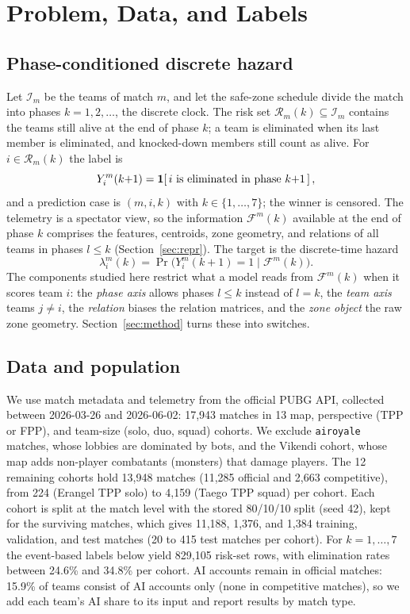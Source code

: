 \section{Problem, Data, and Labels}\label{sec:problem}

\subsection{Phase-conditioned discrete hazard}\label{sec:hazard}
Let $\mathcal{I}_m$ be the teams of match $m$, and let the safe-zone schedule divide the match into phases $k=1,2,\dots$, the discrete clock. The risk set $\mathcal{R}_m(k)\subseteq\mathcal{I}_m$ contains the teams still alive at the end of phase $k$; a team is eliminated when its last member is eliminated, and knocked-down members still count as alive. For $i\in\mathcal{R}_m(k)$ the label is
\begin{equation}
Y_i^m(k{+}1)=\mathbf{1}\!\left[\,i\text{ is eliminated in phase }k{+}1\,\right],
\label{eq:label}
\end{equation}
and a prediction case is $(m,i,k)$ with $k\in\{1,\dots,7\}$; the winner is censored. The telemetry is a spectator view, so the information $\mathcal{F}^m(k)$ available at the end of phase $k$ comprises the features, centroids, zone geometry, and relations of all teams in phases $l\le k$ (Section~\ref{sec:repr}). The target is the discrete-time hazard
\begin{equation}
\lambda_i^m(k)=\Pr\bigl(Y_i^m(k{+}1)=1\mid\mathcal{F}^m(k)\bigr).
\label{eq:hazard}
\end{equation}
The components studied here restrict what a model reads from $\mathcal{F}^m(k)$ when it scores team $i$: the \emph{phase axis} allows phases $l\le k$ instead of $l=k$, the \emph{team axis} teams $j\neq i$, the \emph{relation} biases the relation matrices, and the \emph{zone object} the raw zone geometry. Section~\ref{sec:method} turns these into switches.

\subsection{Data and population}\label{sec:data}
We use match metadata and telemetry from the official PUBG API, collected between 2026-03-26 and 2026-06-02: 17,943 matches in 13 map, perspective (TPP or FPP), and team-size (solo, duo, squad) cohorts. We exclude \texttt{airoyale} matches, whose lobbies are dominated by bots, and the Vikendi cohort, whose map adds non-player combatants (monsters) that damage players. The 12 remaining cohorts hold 13,948 matches (11,285 official and 2,663 competitive), from 224 (Erangel TPP solo) to 4,159 (Taego TPP squad) per cohort. Each cohort is split at the match level with the stored 80/10/10 split (seed 42), kept for the surviving matches, which gives 11,188, 1,376, and 1,384 training, validation, and test matches (20 to 415 test matches per cohort). For $k=1,\dots,7$ the event-based labels below yield 829,105 risk-set rows, with elimination rates between 24.6\% and 34.8\% per cohort. AI accounts remain in official matches: 15.9\% of teams consist of AI accounts only (none in competitive matches), so we add each team's AI share to its input and report results by match type.

